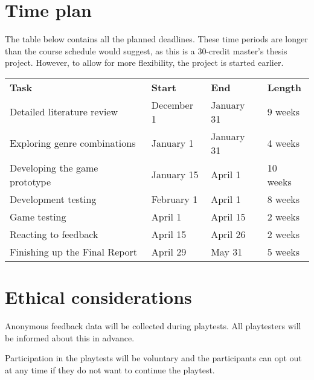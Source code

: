 \section{Time plan}

The table below contains all the planned deadlines. These time periods are longer than the course schedule would suggest, as this is a 30-credit master's thesis project. However, to allow for more flexibility, the project is started earlier.

\begin{center}
    \begin{tabular}{ l l l l }
        \textbf{Task}                   & \textbf{Start} & \textbf{End} & \textbf{Length} \\
        Detailed literature review      & December 1     & January  31  & 9 weeks         \\
        Exploring genre combinations    & January 1      & January 31   & 4 weeks         \\
        Developing the game prototype   & January 15     & April 1      & 10 weeks        \\
        Development testing             & February 1     & April 1      & 8 weeks         \\
        Game testing                    & April 1        & April 15     & 2 weeks         \\
        Reacting to feedback            & April 15       & April 26     & 2 weeks         \\
        Finishing up the Final Report   & April 29       & May 31       & 5 weeks         \\
    \end{tabular}
\end{center}



\section{Ethical considerations}

Anonymous feedback data will be collected during playtests. All playtesters will be informed about this in advance. 

Participation in the playtests will be voluntary and the participants can opt out at any time if they do not want to continue the playtest.


